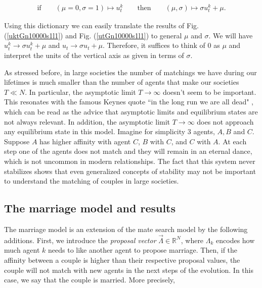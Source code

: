 \documentclass[12pt]{article}
\begin{document}
\begin{align}
    \textrm{if}\qquad(\mu=0,\sigma=1)\mapsto u_t^k\qquad\textrm{then}\qquad (\mu,\sigma)\mapsto \sigma u_t^k+\mu.
    \label{generalmusigma}
\end{align}

\noindent Using this dictionary we can easily translate the results of Fig. (\ref{uktGn10000s1l1}) and Fig. (\ref{utGn10000s1l1}) to general $\mu$ and $\sigma$. We will have $u_t^k\rightarrow \sigma u_t^k+\mu$ and $u_t\rightarrow \sigma u_t+\mu$. Therefore, it suffices to think of $0$ as $\mu$ and interpret the units of the vertical axis as given in terms of $\sigma$.


As stressed before, in large societies the number of matchings we have during our lifetimes is much smaller than the number of agents that make our societies $T\ll N$. In particular, the asymptotic limit $T\rightarrow\infty$ doesn't seem to be important. This resonates with the famous Keynes quote ``in the long run we are all dead" \cite{keynes1923tract}, which can be read as the advice that asymptotic limits and equilibrium states are not always relevant. In addition, the asymptotic limit $T\rightarrow\infty$ does not approach any equilibrium state in this model. Imagine for simplicity 3 agents, $A,B$ and $C$. Suppose $A$ has higher affinity with agent $C$, $B$ with $C$, and $C$ with $A$. At each step one of the agents does not match and they will remain in an eternal dance, which is not uncommon in modern relationships. The fact that this system never stabilizes shows that even generalized concepts of stability \cite{Multi-period,doval2021dynamically,Credibility,DAMIANO200534} may not be important to understand the matching of couples in large societies.


\subsection{The marriage model and results}
\label{benefitsofmarriage}

The marriage model is an extension of the mate search model by the following additions. First, we introduce the \textit{proposal vector} $\vec{\Lambda}\in\mathbb{R}^N$, where $\Lambda_k$ encodes how much agent $k$ needs to like another agent to propose marriage. Then, if the affinity between a couple is higher than their respective proposal values, the couple will not match with new agents in the next steps of the evolution. In this case, we say that the couple is married. More precisely, 
\end{document}
